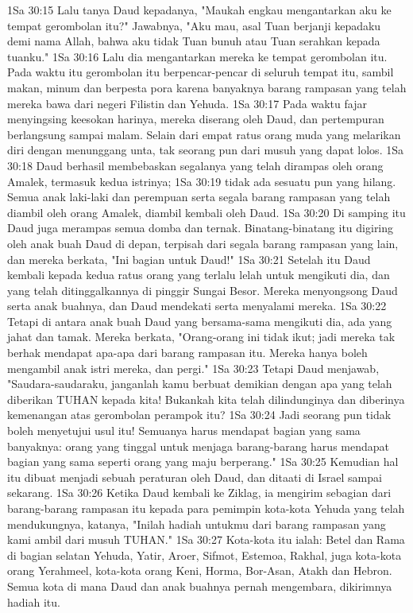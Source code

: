1Sa 30:15  Lalu tanya Daud kepadanya, "Maukah engkau mengantarkan aku ke tempat gerombolan itu?" Jawabnya, "Aku mau, asal Tuan berjanji kepadaku demi nama Allah, bahwa aku tidak Tuan bunuh atau Tuan serahkan kepada tuanku."
1Sa 30:16  Lalu dia mengantarkan mereka ke tempat gerombolan itu. Pada waktu itu gerombolan itu berpencar-pencar di seluruh tempat itu, sambil makan, minum dan berpesta pora karena banyaknya barang rampasan yang telah mereka bawa dari negeri Filistin dan Yehuda.
1Sa 30:17  Pada waktu fajar menyingsing keesokan harinya, mereka diserang oleh Daud, dan pertempuran berlangsung sampai malam. Selain dari empat ratus orang muda yang melarikan diri dengan menunggang unta, tak seorang pun dari musuh yang dapat lolos.
1Sa 30:18  Daud berhasil membebaskan segalanya yang telah dirampas oleh orang Amalek, termasuk kedua istrinya;
1Sa 30:19  tidak ada sesuatu pun yang hilang. Semua anak laki-laki dan perempuan serta segala barang rampasan yang telah diambil oleh orang Amalek, diambil kembali oleh Daud.
1Sa 30:20  Di samping itu Daud juga merampas semua domba dan ternak. Binatang-binatang itu digiring oleh anak buah Daud di depan, terpisah dari segala barang rampasan yang lain, dan mereka berkata, "Ini bagian untuk Daud!"
1Sa 30:21  Setelah itu Daud kembali kepada kedua ratus orang yang terlalu lelah untuk mengikuti dia, dan yang telah ditinggalkannya di pinggir Sungai Besor. Mereka menyongsong Daud serta anak buahnya, dan Daud mendekati serta menyalami mereka.
1Sa 30:22  Tetapi di antara anak buah Daud yang bersama-sama mengikuti dia, ada yang jahat dan tamak. Mereka berkata, "Orang-orang ini tidak ikut; jadi mereka tak berhak mendapat apa-apa dari barang rampasan itu. Mereka hanya boleh mengambil anak istri mereka, dan pergi."
1Sa 30:23  Tetapi Daud menjawab, "Saudara-saudaraku, janganlah kamu berbuat demikian dengan apa yang telah diberikan TUHAN kepada kita! Bukankah kita telah dilindunginya dan diberinya kemenangan atas gerombolan perampok itu?
1Sa 30:24  Jadi seorang pun tidak boleh menyetujui usul itu! Semuanya harus mendapat bagian yang sama banyaknya: orang yang tinggal untuk menjaga barang-barang harus mendapat bagian yang sama seperti orang yang maju berperang."
1Sa 30:25  Kemudian hal itu dibuat menjadi sebuah peraturan oleh Daud, dan ditaati di Israel sampai sekarang.
1Sa 30:26  Ketika Daud kembali ke Ziklag, ia mengirim sebagian dari barang-barang rampasan itu kepada para pemimpin kota-kota Yehuda yang telah mendukungnya, katanya, "Inilah hadiah untukmu dari barang rampasan yang kami ambil dari musuh TUHAN."
1Sa 30:27  Kota-kota itu ialah: Betel dan Rama di bagian selatan Yehuda, Yatir, Aroer, Sifmot, Estemoa, Rakhal, juga kota-kota orang Yerahmeel, kota-kota orang Keni, Horma, Bor-Asan, Atakh dan Hebron. Semua kota di mana Daud dan anak buahnya pernah mengembara, dikirimnya hadiah itu.
